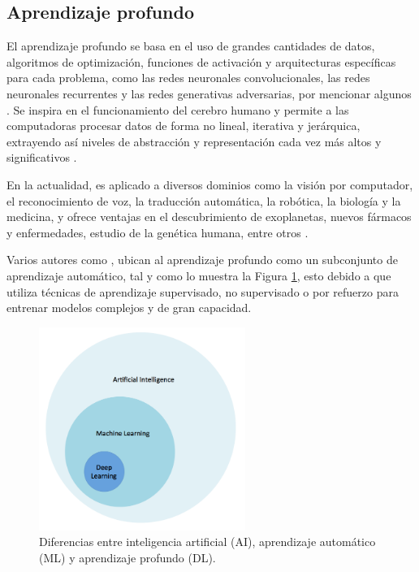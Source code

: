 \subsection{Aprendizaje profundo}

El aprendizaje profundo se basa en el uso de grandes cantidades de datos, algoritmos de optimización, funciones de activación y arquitecturas específicas para cada problema, como las redes neuronales convolucionales, las redes neuronales recurrentes y las redes generativas adversarias, por mencionar algunos \cite{geron2019hands}. Se inspira en el funcionamiento del cerebro humano y permite a las computadoras procesar datos de forma no lineal, iterativa y jerárquica, extrayendo así niveles de abstracción y representación cada vez más altos y significativos \cite{goodfellow2016deep}.

En la actualidad, es aplicado a diversos dominios como la visión por computador, el reconocimiento de voz, la traducción automática, la robótica, la biología y la medicina, y ofrece ventajas en el descubrimiento de exoplanetas, nuevos fármacos y enfermedades, estudio de la genética humana, entre otros \cite{patterson2017deep}.

Varios autores como , ubican al aprendizaje profundo como un subconjunto de aprendizaje automático, tal y como lo muestra la Figura \ref{fig:ia}, esto debido a que utiliza técnicas de aprendizaje supervisado, no supervisado o por refuerzo para entrenar modelos complejos y de gran capacidad.

\begin{figure}[H]
    \begin{center}
        \includegraphics[width=0.6\textwidth]{Images/relation.png}
    \end{center}
    \caption{Diferencias entre inteligencia artificial (AI), aprendizaje automático (ML) y aprendizaje profundo (DL).}
    \label{fig:ia}
\end{figure}

